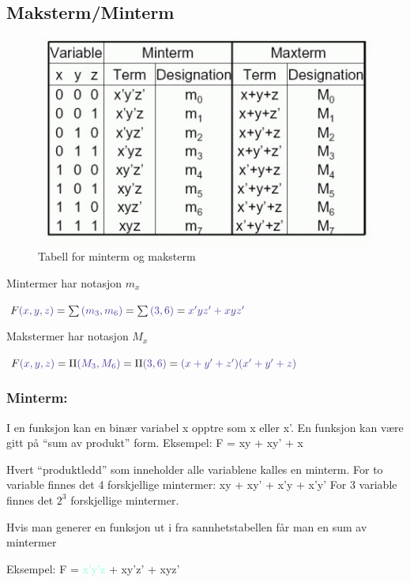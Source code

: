 \documentclass{article}
\begin{document}
	\subsection*{Maksterm/Minterm}
	
	\begin{figure}[H]
		\includegraphics[scale=0.8]{maksmin.jpg}
		\caption{Tabell for minterm og maksterm}
	\end{figure}
	
	Mintermer har notasjon $m_x$
	
	$F\textcolor{Violet}{(x,y,z)} = \sum\textcolor{Violet}{(m_3, m_6)} = \sum\textcolor{Violet}{(3, 6)} = \textcolor{Violet}{ x'yz' + xyz'} $
	
	Makstermer har notasjon $M_x$
	
	$F\textcolor{Violet}{(x,y,z)} = \Pi \textcolor{Violet}{(M_3, M_6)} = \Pi \textcolor{Violet}{(3, 6)} = \textcolor{Violet}{(x+y'+z')(x'+y'+z)} $
	
	\subsubsection*{Minterm:}
	I en funksjon kan en binær variabel x opptre som x eller x'.	En funksjon kan være gitt på “sum av produkt” form.
	Eksempel: F = xy + xy' + x
	
	Hvert “produktledd” som inneholder alle variablene kalles en minterm. For to variable finnes det 4 forskjellige mintermer: xy + xy' + x'y + x'y'
	For 3 variable finnes det $2^3$ forskjellige mintermer. 
	
	Hvis man generer en funksjon ut i fra sannhetstabellen får man en sum av mintermer
	
	Eksempel:  F = \textcolor{Aquamarine}{x'y'z} + \textcolor{BurntOrange}{xy'z'} + \textcolor{WildStrawberry}{xyz'}
	
\end{document}
